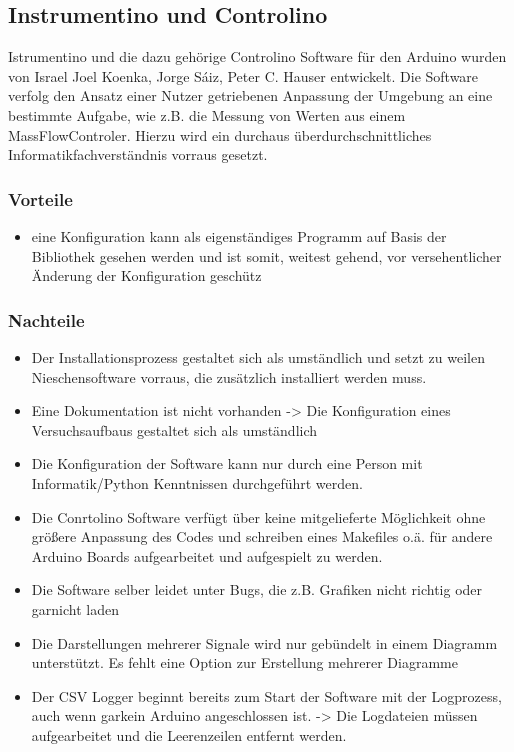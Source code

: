 \subsection{Instrumentino und Controlino}
Istrumentino und die dazu gehörige Controlino Software für den Arduino wurden 
von Israel Joel Koenka, Jorge Sáiz, Peter C. Hauser entwickelt. Die Software 
verfolg den Ansatz einer Nutzer getriebenen Anpassung der Umgebung an eine 
bestimmte Aufgabe, wie z.B. die Messung von Werten aus einem MassFlowControler.
Hierzu wird ein durchaus überdurchschnittliches Informatikfachverständnis 
vorraus gesetzt.

\subsubsection{Vorteile}
\begin{itemize}
 \item eine Konfiguration kann als eigenständiges Programm auf Basis der 
Bibliothek gesehen werden und ist somit, weitest gehend, vor versehentlicher 
Änderung der Konfiguration geschütz
\end{itemize}

\subsubsection{Nachteile}
\begin{itemize}
 \item Der Installationsprozess gestaltet sich als umständlich und setzt zu 
weilen Nieschensoftware vorraus, die zusätzlich installiert werden muss.
 \item Eine Dokumentation ist nicht vorhanden -> Die Konfiguration eines 
Versuchsaufbaus gestaltet sich als umständlich
 \item Die Konfiguration der Software kann nur durch eine Person mit 
Informatik/Python Kenntnissen durchgeführt werden.
 \item Die Conrtolino Software verfügt über keine mitgelieferte Möglichkeit 
ohne größere Anpassung des Codes und schreiben eines Makefiles o.ä. für andere 
Arduino Boards aufgearbeitet und aufgespielt zu werden.
 \item Die Software selber leidet unter Bugs, die z.B. Grafiken nicht richtig 
oder garnicht laden
 \item Die Darstellungen mehrerer Signale wird nur gebündelt in einem Diagramm 
unterstützt. Es fehlt eine Option zur Erstellung mehrerer Diagramme
 \item Der CSV Logger beginnt bereits zum Start der Software mit der 
Logprozess, auch wenn garkein Arduino angeschlossen ist. -> Die Logdateien 
müssen aufgearbeitet und die Leerenzeilen entfernt werden.
\end{itemize}
